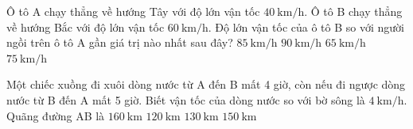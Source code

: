 \begin{ex}
	Ô tô A chạy thẳng về hướng Tây với độ lớn vận tốc $\SI{40}{\kilo\meter/\hour}$. Ô tô B chạy thẳng về hướng Bắc với độ lớn vận tốc $\SI{60}{\kilo\meter/\hour}$. Độ lớn vận tốc của ô tô B so với người ngồi trên ô tô A gần giá trị nào nhất sau đây?
	\choice
	{$\SI{85}{\kilo\meter/\hour}$}
	{$\SI{90}{\kilo\meter/\hour}$}
	{$\SI{65}{\kilo\meter/\hour}$}
	{\True $\SI{75}{\kilo\meter/\hour}$}
\end{ex}

\begin{ex}
	Một chiếc xuồng đi xuôi dòng nước từ A đến B mất 4 giờ, còn nếu đi ngược dòng nước từ B đến A mất 5 giờ. Biết vận tốc của dòng nước so với bờ sông là $\SI{4}{\kilo\meter/\hour}$. Quãng đường AB là
	\choice
	{\True $\SI{160}{\kilo\meter}$}
	{$\SI{120}{\kilo\meter}$}
	{$\SI{130}{\kilo\meter}$}
	{$\SI{150}{\kilo\meter}$}
	\loigiai{}
\end{ex}

